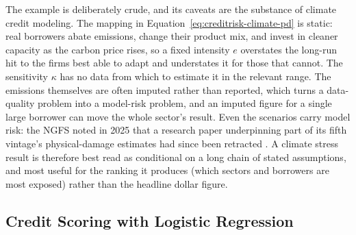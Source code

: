 \documentclass[../ai_in_finance]{subfiles}
\begin{document}
The example is deliberately crude, and its caveats are the substance of climate credit modeling. The mapping in Equation~\eqref{eq:creditrisk-climate-pd} is static: real borrowers abate emissions, change their product mix, and invest in cleaner capacity as the carbon price rises, so a fixed intensity $e$ overstates the long-run hit to the firms best able to adapt and understates it for those that cannot. The sensitivity $\kappa$ has no data from which to estimate it in the relevant range. The emissions themselves are often imputed rather than reported, which turns a data-quality problem into a model-risk problem, and an imputed figure for a single large borrower can move the whole sector's result. Even the scenarios carry model risk: the NGFS noted in 2025 that a research paper underpinning part of its fifth vintage's physical-damage estimates had since been retracted \parencite{ngfs2024scenarios}. A climate stress result is therefore best read as conditional on a long chain of stated assumptions, and most useful for the ranking it produces (which sectors and borrowers are most exposed) rather than the headline dollar figure.

\subsection{Credit Scoring with Logistic Regression}
\label{sec:credit-scoring}
\end{document}
